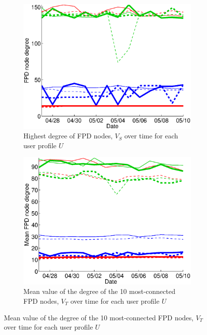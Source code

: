 \documentclass{sig-alternate}
\begin{document}
  \begin{figure}
   \centering
   \begin{subfigure}{.38\textwidth}
    \includegraphics[width=\textwidth]{figures/plots/first-mean-top1-entities.eps}
    \caption{Highest degree of FPD nodes, $V_S$ over time for each user profile $U$}
    \label{fig:first_mean_top1_without_entities}
  \end{subfigure}
  \begin{subfigure}{.38\textwidth}
    \includegraphics[width=\textwidth]{figures/plots/first-mean-top10-entities.eps}
    \caption{Mean value of the degree of the 10 most-connected FPD nodes, $V_T$ over time for each user profile $U$}
    \label{fig:first_mean_top10_without_entities}

\end{subfigure}
\end{figure}
\end{document}
